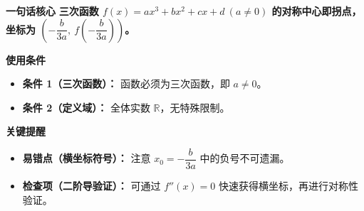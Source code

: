 \begin{summarybox}
	\textbf{\textcolor{CSummary}{一句话核心}}
	\textbf{三次函数 $f(x)=ax^3+bx^2+cx+d\ (a\neq0)$ 的对称中心即拐点，坐标为 $\left(-\dfrac{b}{3a},\ f\!\left(-\dfrac{b}{3a}\right)\right)$。}

	\medskip
	\textbf{\textcolor{CSummary}{使用条件}}
	\begin{itemize}[leftmargin=*, itemsep=0.5em, topsep=0.4em]
		\item \textbf{条件 1（三次函数）：} 函数必须为三次函数，即 $a\neq0$。
		\item \textbf{条件 2（定义域）：} 全体实数 $\mathbb{R}$，无特殊限制。
	\end{itemize}

	\medskip
	\textbf{\textcolor{CSummary}{关键提醒}}
	\begin{itemize}[leftmargin=*, itemsep=0.5em, topsep=0.4em]
		\item \textbf{易错点（横坐标符号）：} 注意 $x_0=-\dfrac{b}{3a}$ 中的负号不可遗漏。
		\item \textbf{检查项（二阶导验证）：} 可通过 $f''(x)=0$ 快速获得横坐标，再进行对称性验证。
	\end{itemize}

\end{summarybox}
